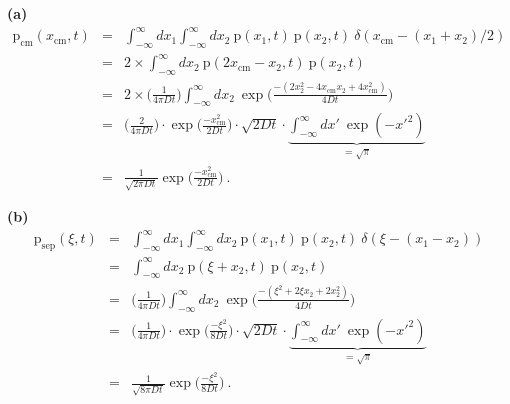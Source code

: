 \textbf{(a)}
\begin{eqnarray}
\text{p}_\text{cm}(x_\text{cm}, t) &=& \int_{-\infty}^{\infty} dx_1  \int_{-\infty}^{\infty} dx_2 ~ \text{p}(x_1, t)~\text{p}(x_2, t)~\delta(x_\text{cm} - (x_1 + x_2)/2) \nonumber \\
&=& 2 \times \int_{-\infty}^{\infty} dx_2 ~ \text{p}(2 x_\text{cm} - x_2, t)~\text{p}(x_2, t) \nonumber \\
&=& 2 \times \bigg(\frac{1}{4 \pi D t}\bigg) \int_{-\infty}^{\infty} dx_2 ~ \exp\bigg( \frac{-(2 x_2^2 - 4 x_\text{cm} x_2 + 4 x_\text{cm}^2)}{4 D t}
\bigg) \nonumber \\
&=& \bigg(\frac{2}{4 \pi D t}\bigg) \cdot \exp\bigg( \frac{-x_\text{cm}^2}{2 D t}\bigg) \cdot \sqrt{2 D t} \cdot \underbrace{\int_{-\infty}^{\infty} dx' ~ \exp(-x'^2)}_{=\sqrt{\pi}} \nonumber \\
&=& \boxed{\frac{1}{\sqrt{2 \pi D t}} \exp\bigg( \frac{-x_\text{cm}^2}{2 D t}\bigg)}~.
\end{eqnarray}

\textbf{(b)}
\begin{eqnarray}
\text{p}_\text{sep}(\xi, t) &=& \int_{-\infty}^{\infty} dx_1  \int_{-\infty}^{\infty} dx_2 ~ \text{p}(x_1, t)~\text{p}(x_2, t)~\delta(\xi - (x_1 - x_2)) \nonumber \\
&=& \int_{-\infty}^{\infty} dx_2 ~ \text{p}(\xi + x_2, t)~\text{p}(x_2, t) \nonumber \\
&=& \bigg(\frac{1}{4 \pi D t}\bigg) \int_{-\infty}^{\infty} dx_2 ~ \exp\bigg( \frac{-(\xi^2 + 2 \xi x_2 + 2 x_2^2)}{4 D t}
\bigg) \nonumber \\
&=& \bigg(\frac{1}{4 \pi D t}\bigg) \cdot \exp\bigg( \frac{-\xi^2}{8 D t}\bigg) \cdot \sqrt{2 D t} \cdot \underbrace{\int_{-\infty}^{\infty} dx' ~ \exp(-x'^2)}_{=\sqrt{\pi}} \nonumber \\
&=& \boxed{\frac{1}{\sqrt{8 \pi D t}} \exp\bigg( \frac{-\xi^2}{8 D t}\bigg)}~.
\end{eqnarray}

